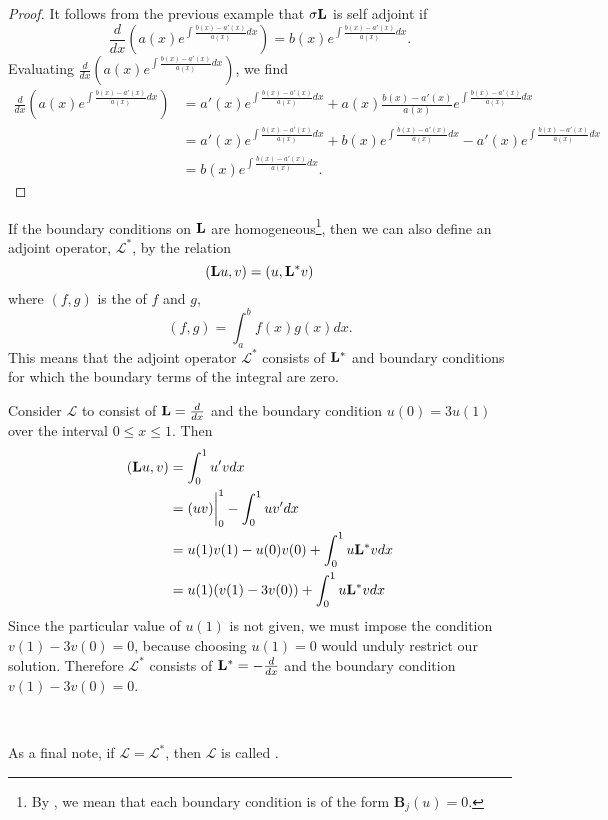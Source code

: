 \begin{proof}
	It follows from the previous example that \(\sigma\mathrm{\bf{L}}\) is self adjoint if
	\begin{equation*}
		\frac{d}{dx}\left(a(x)e^{\int \frac{b(x)-a'(x)}{a(x)}dx}\right) = b(x)e^{\int \frac{b(x)-a'(x)}{a(x)}dx}.
	\end{equation*}
	Evaluating \(\frac{d}{dx}\left(a(x)e^{\int \frac{b(x)-a'(x)}{a(x)}dx}\right)\), we find
	\begin{equation*}
		\begin{split}
			\frac{d}{dx}(a(x)e^{\int \frac{b(x)-a'(x)}{a(x)}dx}) &= a'(x)e^{\int \frac{b(x)-a'(x)}{a(x)}dx} + a(x)\frac{b(x)-a'(x)}{a(x)}e^{\int \frac{b(x)-a'(x)}{a(x)}dx}\\
			&=a'(x)e^{\int \frac{b(x)-a'(x)}{a(x)}dx} + b(x)e^{\int \frac{b(x)-a'(x)}{a(x)}dx} - a'(x)e^{\int \frac{b(x)-a'(x)}{a(x)}dx}\\
			&=b(x)e^{\int \frac{b(x)-a'(x)}{a(x)}dx}.
		\end{split}
	\end{equation*}
\end{proof}

\begin{definition}
	If the boundary conditions on \(\mathrm{\bf{L}}\) are homogeneous\footnote{By , we mean that each boundary condition is of the form \(\mathbf{B}_j (u)=0\).}, then we can also define an adjoint operator, \(\mathcal{L}^*\), by the relation
	\begin{equation}
		(\mathrm{\bf{L}} u,v) = (u,\mathrm{\bf{L^*}} v)
	\end{equation}
	where \((f,g)\) is the  of \(f\) and \(g\),
	\begin{equation}
		(f,g) = \int_a^bf(x)g(x)dx.
	\end{equation}
	This means that the adjoint operator \(\mathcal{L}^*\) consists of \(\mathrm{\bf{L^*}} \) and boundary conditions for which the boundary terms of the integral are zero. 
\end{definition}

\begin{example}
	Consider \(\mathcal{L}\) to consist of \(\mathrm{\bf{L}}=\frac{d}{dx}\) and the boundary condition \(u(0)=3u(1)\) over the interval \(0\leq x \leq 1\). Then
	\begin{equation}
		\begin{split}
			(\mathrm{\bf{L}} u,v) &= \int_0^1u'vdx\\
			       &= (uv)\biggr\rvert_0^1 - \int_0^1 uv'dx\\
			       &= u(1)v(1)-u(0)v(0)+\int_0^1u\mathrm{\bf{L^*}} vdx\\
			       &= u(1)(v(1)-3v(0)) + \int_0^1u\mathrm{\bf{L^*}} vdx
		\end{split}
	\end{equation}
	Since the particular value of \(u(1)\) is not given, we must impose the condition \(v(1)-3v(0)=0\), because choosing \(u(1)=0\) would unduly restrict our solution. Therefore \(\mathcal{L^*}\) consists of \(\mathrm{\bf{L^*}} = -\frac{d}{dx}\) and the boundary condition \(v(1) - 3v(0)=0\). 
\end{example}

\

As a final note, if \(\mathcal{L}=\mathcal{L}^*\), then \(\mathcal{L}\) is called .
